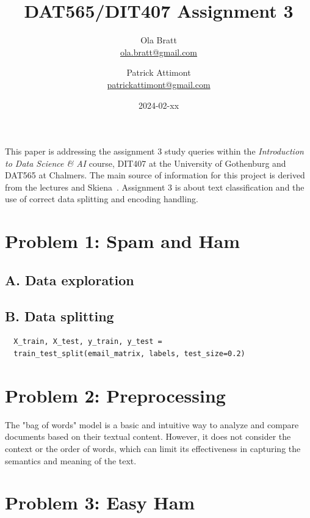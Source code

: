 \documentclass[a4paper]{article}
\begin{document}
\author{Ola Bratt \\
  \href{mailto:ola.bratt@gmail.com}{ola.bratt@gmail.com}
  \and
  Patrick Attimont \\
  \href{patrickattimont@gmail.com}{patrickattimont@gmail.com}
}

\title{DAT565/DIT407 Assignment 3}
\date{2024-02-xx}

\maketitle

This paper is addressing the assignment 3 study queries within the \emph{Introduction to Data Science \& AI} course, DIT407 at 
the University of Gothenburg and DAT565 at Chalmers. The main source of information for this project
is derived from the lectures and Skiena~\cite{Skiena:2024}. Assignment 3 is about text classification and the 
use of correct data splitting and encoding handling.

\section*{Problem 1: Spam and Ham}

\subsection*{A. Data exploration}

\subsection*{B. Data splitting}

\begin{verbatim}
  X_train, X_test, y_train, y_test = 
  train_test_split(email_matrix, labels, test_size=0.2)
\end{verbatim}
\section*{Problem 2: Preprocessing}
The "bag of words" model is a basic and intuitive way to analyze and compare documents based on their textual content. 
However, it does not consider the context or the order of words, which can limit its effectiveness in capturing the semantics 
and meaning of the text.
\section*{Problem 3: Easy Ham}
\end{document}
